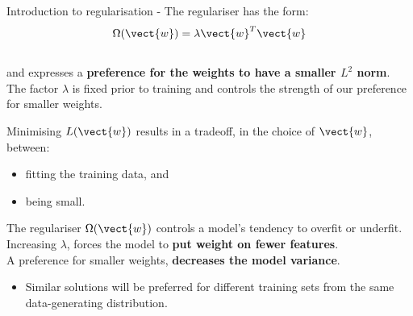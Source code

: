 \begin{frame}[t,allowframebreaks]{Introduction to regularisation -}
The \gls{regulariser} has the form:
\begin{equation}
    \Omega(\vect{w}) = \lambda \vect{w}^T \vect{w} 
\end{equation}\\

and expresses a {\bf preference for the weights to have a smaller $L^2$ norm}.\\
\vspace{0.1cm}
The factor $\lambda$ is fixed prior to training and controls the
strength of our preference for smaller weights.
\vspace{0.2cm}

Minimising $L(\vect{w})$ results in a tradeoff, 
in the choice of $\vect{w}$, between:
\begin{itemize}
\item fitting the training data, and
\item being small.
\end{itemize}

\framebreak

%
%

The \gls{regulariser}
$\Omega(\vect{w})$ controls 
a model's tendency to overfit or underfit.\\
\vspace{0.2cm}
Increasing $\lambda$, forces the model to {\bf put weight
on fewer features}.\\
\vspace{0.2cm}
A preference for smaller weights, {\bf decreases the model variance}.
\begin{itemize}
    \small
    \item
    Similar solutions will be preferred for 
    different training sets from the same data-generating distribution.
\end{itemize}


\end{frame}

